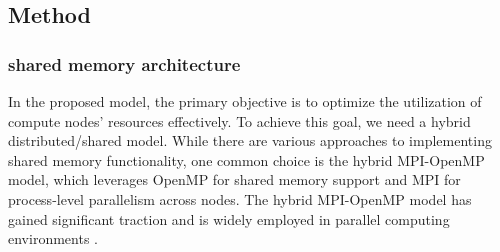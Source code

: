








\subsection{Method}
\subsubsection{shared memory architecture}
In the proposed model, the primary objective is to optimize the utilization of compute nodes' resources effectively. To achieve this goal, we need a hybrid distributed/shared model. While there are various approaches to implementing shared memory functionality, one common choice is the hybrid MPI-OpenMP model, which leverages OpenMP for shared memory support and MPI for process-level parallelism across nodes. The hybrid MPI-OpenMP model has gained significant traction and is widely employed in parallel computing environments \cite{ouro2019scalability,he2020structured,zhong2020efficient}.

